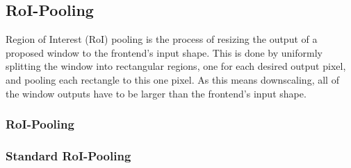 \subsection{RoI-Pooling}
Region of Interest (RoI) pooling is the process of
resizing the output of a proposed window to the frontend's input
shape.
This is done by uniformly splitting the window into rectangular
regions, one for each desired output pixel, and pooling each
rectangle to this one pixel. As this means downscaling, all of the
window outputs have to be larger than the frontend's input shape.
\begin{frame}
  \frametitle<presentation>{RoI-Pooling}
  \frametitle<article>{Standard RoI-Pooling}
  \begin{figure}
\end{figure}
\end{frame}
